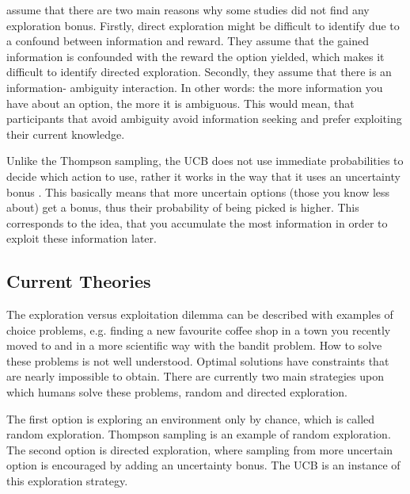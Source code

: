 \cite{wilson2014humans} assume that there are two main reasons why some studies did not find any exploration bonus. Firstly, direct exploration might be difficult to identify due to a confound between information and reward. They assume that the gained information is confounded with the reward the option yielded, which makes it difficult to identify directed exploration. 
Secondly, they assume that there is an information- ambiguity interaction. In other words: the more information you have about an option, the more it is ambiguous. This would mean, that participants that avoid ambiguity avoid information seeking and prefer exploiting their current knowledge.


Unlike the Thompson sampling, the UCB \citep{auer2002finite} does not use immediate probabilities to decide which action to use, rather it works in the way that it uses an uncertainty bonus \citep{srinivas2009gaussian}. This basically means that more uncertain options (those you know less about) get a bonus, thus their probability of being picked is higher. This corresponds to the idea, that you accumulate the most information in order to exploit these information later.

\subsection{Current Theories}
The exploration versus exploitation dilemma can be described with examples of choice problems, e.g. finding a new favourite coffee shop in a town you recently moved to and in a more scientific way with the bandit problem. How to solve these problems is not well understood. Optimal solutions have constraints that are nearly impossible to obtain. There are currently two main strategies upon which humans solve these problems, random and directed exploration.  

The first option is exploring an environment only by chance, which is called random exploration. Thompson sampling is an example of random exploration.
The second option is directed exploration, where sampling from more uncertain option is encouraged by adding an uncertainty bonus. The UCB is an instance of this exploration strategy.

